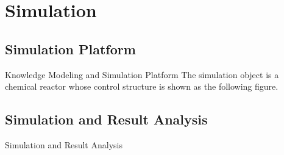 \section{Simulation}
\subsection{Simulation Platform}
\begin{frame}{Knowledge Modeling and Simulation Platform}
    The simulation object is a chemical reactor whose control structure is shown as the following figure.\\[-10pt]
    \begin{center}
      
    \end{center}
\end{frame}

\subsection{Simulation and Result Analysis}
\begin{frame}{Simulation and Result Analysis}
\end{frame} 